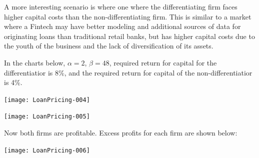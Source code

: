 \documentclass{article}
\theoremstyle{definition}
\begin{document}
A more interesting scenario is where one where the differentiating firm faces higher capital costs than the non-differentiating firm.  This is similar to a market where a Fintech may have better modeling and additional sources of data for originating loans than traditional retail banks, but has higher capital costs due to the youth of the business and the lack of diversification of its assets.  

In the charts below, \(\alpha=2\), \(\beta=48\), required return for capital for the differentiatior is 8\%, and the required return for capital of the non-differentiatior is 4\%.  


\texttt{[image: LoanPricing-004]}

\texttt{[image: LoanPricing-005]}

Now both firms are profitable.  Excess profits for each firm are shown below:

\texttt{[image: LoanPricing-006]}
\end{document}
